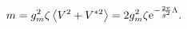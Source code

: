 \begin{equation}
m=g_m^2\zeta \left<V^2+V^{*2}\right>=2g_m^2\zeta {\rm e}^{-{2\pi\over g^2}\Lambda}.
\end{equation}

